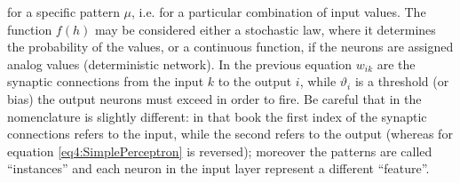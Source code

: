 for a specific pattern $\mu$, i.e. for a particular combination of input values. The function $f(h)$ may be considered either a stochastic law, where it determines the probability of the values, or a continuous function, if the neurons are assigned analog values (deterministic network). In the previous equation $w_{ik}$ are the synaptic connections from the input $k$ to the output $i$, while $\vartheta_i$ is a threshold (or bias) the output neurons must exceed in order to fire. Be careful that in \cite{Geron2} the nomenclature is slightly different: in that book the first index of the synaptic connections refers to the input, while the second refers to the output (whereas for equation \eqref{eq4:SimplePerceptron} is reversed); moreover the patterns are called ``instances'' and each neuron in the input layer represent a different ``feature''.

